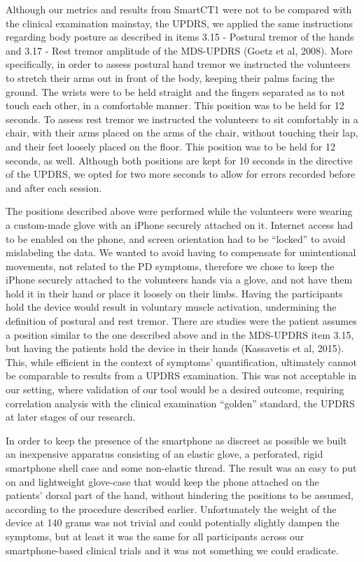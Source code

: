 Although our metrics and results from \gls{SmartCT1} were not to be compared with the clinical examination mainstay, the \gls{UPDRS}, we applied the same instructions regarding body posture as described in items 3.15 - Postural tremor of the hands and 3.17 - Rest tremor amplitude of the \gls{MDS}-\gls{UPDRS} (Goetz et al, 2008). More specifically, in order to assess postural hand tremor we instructed the volunteers to stretch their arms out in front of the body, keeping their palms facing the ground. The wrists were to be held straight and the fingers separated as to not touch each other, in a comfortable manner. This position was to be held for 12 seconds. To assess rest tremor we instructed the volunteers to sit comfortably in a chair, with their arms placed on the arms of the chair, without touching their lap, and their feet loosely placed on the floor. This position was to be held for 12 seconds, as well. Although both positions are kept for 10 seconds in the directive of the \gls{UPDRS}, we opted for two more seconds to allow for errors recorded before and after each session. 

The positions described above were performed while the volunteers were wearing a custom-made glove with an iPhone securely attached on it. Internet access had to be enabled on the phone, and screen orientation had to be “locked” to avoid mislabeling the data. We wanted to avoid having to compensate for unintentional movements, not related to the \gls{PD} symptoms, therefore we chose to keep the iPhone securely attached to the volunteers hands via a glove, and not have them hold it in their hand or place it loosely on their limbs. Having the participants hold the device would result in voluntary muscle activation, undermining the definition of postural and rest tremor. There are studies were the patient assumes a position similar to the one described above and in the \gls{MDS}-\gls{UPDRS} item 3.15, but having the patients hold the device in their hands (Kassavetis et al, 2015). This, while efficient in the context of symptoms' quantification, ultimately cannot be comparable to results from a \gls{UPDRS} examination. This was not acceptable in our setting, where validation of our tool would be a desired outcome, requiring correlation analysis with the clinical examination ``golden'' standard, the \gls{UPDRS} at later stages of our research. 

In order to keep the presence of the smartphone as discreet as possible we built an inexpensive apparatus consisting of an elastic glove, a perforated, rigid smartphone shell case and some non-elastic thread. The result was an easy to put on and lightweight glove-case that would keep the phone attached on the patients' dorsal part of the hand, without hindering the positions to be assumed, according to the procedure described earlier. Unfortunately the weight of the device at 140 grams was not trivial and could potentially slightly dampen the symptoms, but at least it was the same for all participants across our smartphone-based clinical trials and it was not something we could eradicate. 

